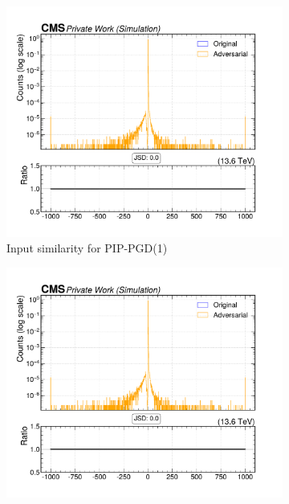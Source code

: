 \begin{figure}[htbp]
  \centering
  \begin{subfigure}[t]{0.32\textwidth}
    \includegraphics[width=\linewidth]{media/output/features/compare/combined_it_1/cmp_vtx_arr_sv_normchi2.pdf}
    \caption*{Input similarity for PIP-PGD(1)}
  \end{subfigure}\hfill
  \begin{subfigure}[t]{0.32\textwidth}
    \includegraphics[width=\linewidth]{media/output/features/compare/combined_it_2/cmp_vtx_arr_sv_normchi2.pdf}

\end{subfigure}
\end{figure}
